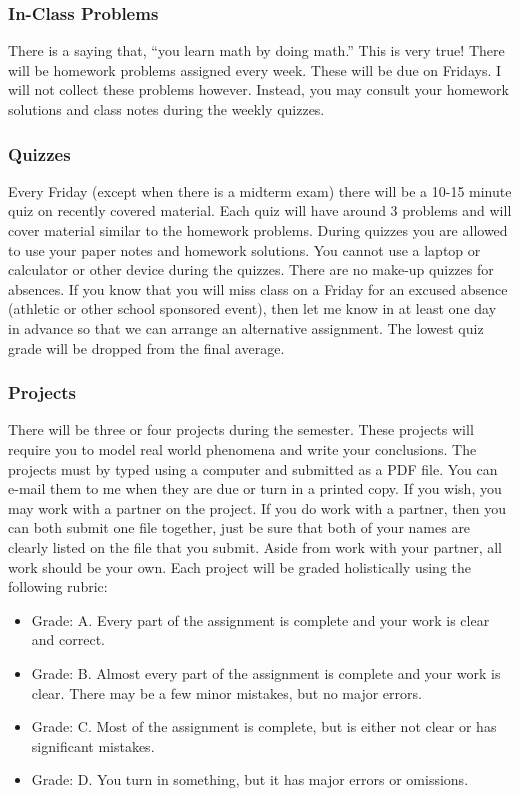 \documentclass[10pt]{article}
\begin{document}
\subsubsection*{In-Class Problems}

There is a saying that, “you learn math by doing math.” This is very true! There will be homework problems assigned every week. These will be due on Fridays. I will not collect these problems however. Instead, you may consult your homework solutions and class notes during the weekly quizzes.


\subsubsection*{Quizzes}

Every Friday (except when there is a midterm exam) there will be a 10-15 minute quiz on recently covered material. Each quiz will have around 3 problems and will cover material similar to the homework problems. During quizzes you are allowed to use your paper notes and homework solutions. You cannot use a laptop or calculator or other device during the quizzes.  There are no make-up quizzes for absences. If you know that you will miss class on a Friday for an excused absence (athletic or other school sponsored event), then let me know in at least one day in advance so that we can arrange an alternative assignment. The lowest quiz grade will be dropped from the final average.

\subsubsection*{Projects}

There will be three or four projects during the semester. These projects will require you to model real world phenomena and write your conclusions. The projects must by typed using a computer and submitted as a PDF file. You can e-mail them to me when they are due or turn in a printed copy. If you wish, you may work with a partner on the project. If you do work with a partner, then you can both submit one file together, just be sure that both of your names are clearly listed on the file that you submit. Aside from work with your partner, all work should be your own. Each project will be graded holistically using the following rubric:

\begin{itemize}
\item Grade: A. Every part of the assignment is complete and your work is clear and correct.
\item Grade: B. Almost every part of the assignment is complete and your work is clear. There may be a few minor mistakes, but no major errors.
\item Grade: C. Most of the assignment is complete, but is either not clear or has significant mistakes.
\item Grade: D. You turn in something, but it has major errors or omissions.
\end{itemize}
\end{document}
